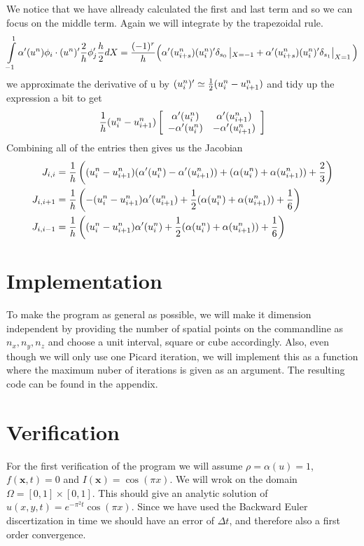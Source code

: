 \documentclass[a4paper,english, 10pt, twoside]{article}
\begin{document}
We notice that we have allready calculated the first and last term and so we can focus on the middle term. Again we will integrate by the trapezoidal rule.
\begin{align*}
 \int\limits_{-1}^1\alpha'(u^n)\phi_i\cdot(u^n)'{2\over h}\phi'_j{h\over2}dX  = {(-1)^r\over h}\Big(\alpha'(u_{i+s}^n)(u_i^n)'\delta_{s_0}\left|_{X=-1} +
 \alpha'(u_{i+s}^n)(u_i^n)'\delta_{s_1}\right|_{X=1}\Big) 
\end{align*}
we approximate the derivative of u by $(u^n_i)' \simeq {1\over2}(u^n_i-u^n_{i+1})$ and tidy up the expression a bit to get
\begin{align*}
 {1\over h}(u^n_i-u^n_{i+1})\left[
 \begin{array}{c c}
  \alpha'(u^n_i) & \alpha'(u^n_{i+1})\\
  -\alpha'(u^n_i) & -\alpha'(u^n_{i+1})
 \end{array}
\right]
\end{align*}
Combining all of the entries then gives us the Jacobian
\begin{align*}
 J_{i,i} &= {1\over h}\left((u^n_i-u^n_{i+1})(\alpha'(u^n_i)-\alpha'(u^n_{i+1})) +(\alpha(u^n_i)+\alpha(u^n_{i+1}))+{2\over3} \right)\\
 J_{i,i+1} &=  {1\over h}\left(-(u^n_i-u^n_{i+1})\alpha'(u^n_{i+1}) +{1\over2}(\alpha(u^n_i)+\alpha(u^n_{i+1}))+{1\over6}\right)\\
 J_{i,i-1} &=  {1\over h}\left((u^n_i-u^n_{i+1})\alpha'(u^n_{i}) +{1\over2}(\alpha(u^n_i)+\alpha(u^n_{i+1}))+{1\over6}\right)
\end{align*}


\section*{Implementation}
To make the program as general as possible, we will make it dimension independent by providing the number of spatial points on the commandline 
as $n_x, n_y, n_z$ and choose a unit interval, square or cube accordingly. Also, even though we will only use one Picard iteration, we will 
implement this as a function where the maximum nuber of iterations is given as an argument. The resulting code can be found in the appendix.

\section*{Verification}
For the first verification of the program we will assume $\rho = \alpha(u) = 1$, $f(\mathbf{x},t) = 0$ and $I(\mathbf{x}) = \cos(\pi x)$. We 
will wrok on the domain $\Omega = [0,1]\times[0,1]$. This should give an analytic solution of $u(x,y,t) = e^{-\pi^2t}\cos(\pi x)$. Since we have used 
the Backward Euler discertization in time we should have an error of $\Delta t$, and therefore also a first order convergence. \\
\end{document}
